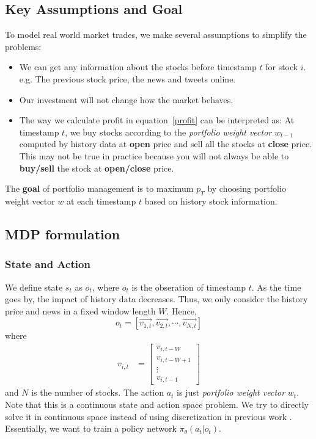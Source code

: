 \documentclass[a4paper, 10pt]{article}
\begin{document}
\begin{spacing}{1.2}
    \subsection{Key Assumptions and Goal}
    To model real world market trades, we make several assumptions to simplify the problems:
    \begin{itemize}
      \item We can get any information about the stocks before timestamp $t$ for stock $i$. e.g. The previous stock price, the news and tweets online.
      \item Our investment will not change how the market behaves.
      \item The way we calculate profit in equation~\ref{profit} can be interpreted as: At timestamp $t$, we buy stocks according to the \emph{portfolio weight vector} $w_{t-1}$ computed by history data at \textbf{open} price and sell all the stocks at \textbf{close} price. This may not be true in practice because you will not always be able to \textbf{buy/sell} the stock at \textbf{open/close} price.
    \end{itemize}
    The \textbf{goal} of portfolio management is to maximum $p_T$ by choosing portfolio weight vector $w$ at each timestamp $t$ based on history stock information.
    
    \subsection{MDP formulation}
    \subsubsection{State and Action}
    We define state $s_t$ as $o_t$, where $o_t$ is the obseration of timestamp $t$. As the time goes by, the impact of history data decreases. Thus, we only consider the history price and news in a fixed window length $W$. Hence,
    \begin{equation}
    o_t=[\vec{v_{1,t}},\vec{v_{2,t}},\cdots,\vec{v_{N,t}}]
    \end{equation}
    where
    \begin{align}
    v_{i,t} &=\begin{bmatrix}
    v_{i,t-W} \\
    v_{i,t-W+1} \\
    \vdots \\
    v_{i,t-1}
    \end{bmatrix}
    \end{align}
    and $N$ is the number of stocks. The action $a_{t}$ is just \emph{portfolio weight vector} $w_{t}$. Note that this is a continuous state and action space problem. We try to directly solve it in continuous space instead of using discretization in previous work \cite{cs229_stanford_portfolio, cs229_stanford_trading}. Essentially, we want to train a policy network $\pi_\theta(a_t|o_t)$.

\end{spacing}
\end{document}
